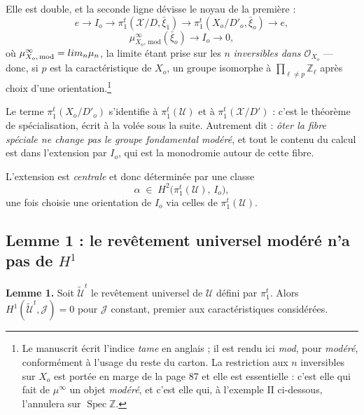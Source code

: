 \documentclass[11pt,a4paper]{article}
\begin{document}
Elle est double, et la seconde ligne dévisse le noyau de la première :
\[
  e \longrightarrow I_{o} \longrightarrow
  \pi_{1}^{t}(\mathcal{X}/D, \bar{\xi}_{1}) \longrightarrow
  \pi_{1}^{t}(X_{o}/D'_{o}, \bar{\xi}_{o}) \longrightarrow e ,
\]
\[
  \mu^{\infty}_{X_{o},\,\mathrm{mod}}(\bar{\xi}_{o}) \longrightarrow
  I_{o} \longrightarrow 0 ,
\]
où $\mu^{\infty}_{X_{o},\,\mathrm{mod}} = \varprojlim_{n} \mu_{n}$, la limite
étant prise sur les $n$ \emph{inversibles dans $\mathcal{O}_{X_{o}}$} --- donc,
si $p$ est la caractéristique de $X_{o}$, un groupe isomorphe à
$\prod_{\ell \neq p} \mathbb{Z}_{\ell}$ après choix d'une
orientation.\footnote{Le manuscrit écrit l'indice \emph{tame} en anglais ; il
est rendu ici \emph{mod}, pour \emph{modéré}, conformément à l'usage du reste
du carton. La restriction aux $n$ inversibles sur $X_{o}$ est portée en marge
de la page 87 et elle est essentielle : c'est elle qui fait de
$\mu^{\infty}$ un objet \emph{modéré}, et c'est elle qui, à l'exemple II
ci-dessous, l'annulera sur $\operatorname{Spec}\mathbb{Z}$.}

Le terme $\pi_{1}^{t}(X_{o}/D'_{o})$ s'identifie à $\pi_{1}^{t}(\mathcal{U})$
et à $\pi_{1}^{t}(\mathcal{X}/D')$ : c'est le théorème de spécialisation, écrit
à la volée sous la suite. Autrement dit : \emph{ôter la fibre spéciale ne change
pas le groupe fondamental modéré}, et tout le contenu du calcul est dans
l'extension par $I_{o}$, qui est la monodromie autour de cette fibre.

L'extension est \emph{centrale} et donc déterminée par une classe
\[
  \alpha \;\in\; H^{2}\bigl(\pi_{1}^{t}(\mathcal{U}),\, I_{o}\bigr) ,
\]
une fois choisie une orientation de $I_{o}$ via celles de
$\pi_{1}^{t}(\mathcal{U})$.

\subsection*{Lemme 1 : le revêtement universel modéré n'a pas de $H^{1}$}

\textbf{Lemme 1.} Soit $\tilde{\mathcal{U}}^{t}$ le revêtement universel de
$\mathcal{U}$ défini par $\pi_{1}^{t}$. Alors
$H^{1}(\tilde{\mathcal{U}}^{t}, \mathcal{J}) = 0$ pour $\mathcal{J}$ constant,
premier aux caractéristiques considérées.
\end{document}

